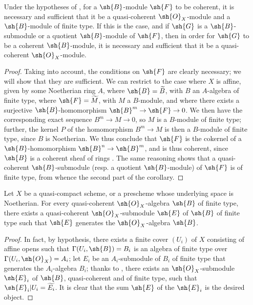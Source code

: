\begin{corollary}[9.6.4]
\label{I.9.6.4}
Under the hypotheses of , for a $\sh{B}$-module $\sh{F}$ to be coherent, it is necessary and sufficient that it be a quasi-coherent $\sh{O}_X$-module and a $\sh{B}$-module of finite type.
If this is the case, and if $\sh{G}$ is a $\sh{B}$-submodule or a quotient $\sh{B}$-module of $\sh{F}$, then in order for $\sh{G}$ to be a coherent $\sh{B}$-module, it is necessary and sufficient that it be a quasi-coherent $\sh{O}_X$-module.
\end{corollary}

\begin{proof}
Taking  into account, the conditions on $\sh{F}$ are clearly necessary; we will show that they are sufficient.
We can restrict to the case where $X$ is affine, given by some Noetherian ring $A$, where $\sh{B}=\widetilde{B}$, with $B$ an $A$-algebra of finite type, where $\sh{F}=\widetilde{M}$, with $M$ a $B$-module, and where there exists a surjective $\sh{B}$-homomorphism $\sh{B}^m\to\sh{F}\to0$.
We then have the corresponding exact sequence $B^m\to M\to0$, so $M$ is a $B$-module of finite type; further, the kernel $P$ of the homomorphism $B^m\to M$ is then a $B$-module of finite type, since $B$ is Noetherian.
We thus conclude  that $\sh{F}$ is the cokernel of a $\sh{B}$-homomorphism $\sh{B}^n\to\sh{B}^m$, and is thus coherent, since $\sh{B}$ is a coherent sheaf of rings .
The same reasoning shows that a quasi-coherent $\sh{B}$-submodule (resp. a quotient $\sh{B}$-module) of $\sh{F}$ is of finite type, from whence the second part of the corollary.
\end{proof}

\begin{proposition}[9.6.5]
\label{I.9.6.5}
Let $X$ be a quasi-compact scheme, or a prescheme whose underlying space is Noetherian.
For every quasi-coherent $\sh{O}_X$-algebra $\sh{B}$ of finite type, there exists a quasi-coherent $\sh{O}_X$-submodule $\sh{E}$ of $\sh{B}$ of finite type such that $\sh{E}$ generates  the $\sh{O}_X$-algebra $\sh{B}$.
\end{proposition}

\begin{proof}
In fact, by hypothesis, there exists a finite cover $(U_i)$ of $X$ consisting of affine opens such that $\Gamma(U_i,\sh{B})=B_i$ is an algebra of finite type over $\Gamma(U_i,\sh{O}_X)=A_i$; let $E_i$ be an $A_i$-submodule of $B_i$ of finite type that generates the $A_i$-algebra $B_i$; thanks to , there exists an $\sh{O}_X$-submodule $\sh{E}_i$ of $\sh{B}$, quasi-coherent and of finite type, such that $\sh{E}_i|U_i=\widetilde{E_i}$.
It is clear that the sum $\sh{E}$ of the $\sh{E}_i$ is the desired object.
\end{proof}

